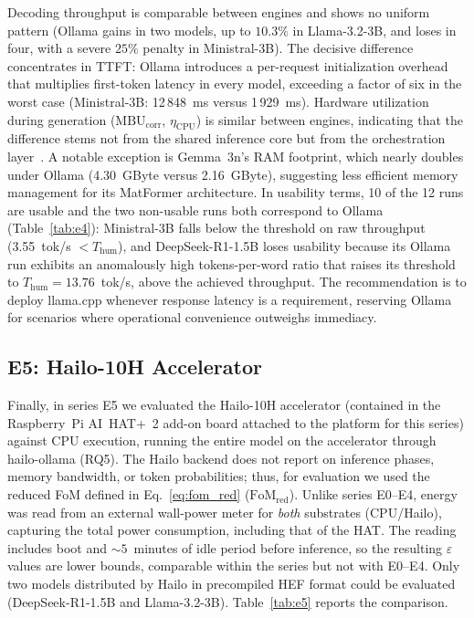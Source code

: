 \documentclass[acmsmall,natbib=false]{acmart}
\begin{document}
Decoding throughput is comparable between engines and shows no uniform
pattern (Ollama gains in two models, up to $10.3\%$ in Llama-3.2-3B, and
loses in four, with a severe $25\%$ penalty in Ministral-3B). The decisive
difference concentrates in TTFT: Ollama introduces a per-request
initialization overhead that multiplies first-token latency in every model,
exceeding a factor of six in the worst case (Ministral-3B: 12\,848~ms versus
1\,929~ms). Hardware utilization during generation
($\mathrm{MBU}_{\mathrm{corr}}$, $\eta_{\mathrm{CPU}}$) is similar between
engines, indicating that the difference stems not from the shared inference
core but from the orchestration layer~\cite{Github_Issue_Ollama}. A notable
exception is Gemma~3n's RAM footprint, which nearly doubles under Ollama
(4.30~GByte versus 2.16~GByte), suggesting less efficient memory management for its
MatFormer architecture. In usability terms, 10 of the 12 runs are usable and
the two non-usable runs both correspond to Ollama
(Table~\ref{tab:e4}): Ministral-3B falls below the threshold on raw
throughput (3.55~tok/s $< T_{\mathrm{hum}}$), and DeepSeek-R1-1.5B loses
usability because its Ollama run exhibits an anomalously high
tokens-per-word ratio that raises its threshold to
$T_{\mathrm{hum}}=13.76$~tok/s, above the achieved throughput. The
recommendation is to deploy llama.cpp
whenever response latency is a requirement, reserving Ollama for scenarios
where operational convenience outweighs immediacy.

\subsection{E5: Hailo-10H Accelerator}\label{sec:results_e5}

Finally, in series E5 we evaluated the Hailo-10H accelerator (contained in the
Raspberry~Pi AI~HAT+~2 add-on board attached to the platform for this
series) against CPU execution, running the entire model on the accelerator
through hailo-ollama (RQ5). The Hailo
backend does not report on inference phases, memory bandwidth, or token
probabilities; thus, for evaluation we used the reduced FoM defined in
Eq.~\eqref{eq:fom_red} ($\mathrm{FoM}_{\mathrm{red}}$). Unlike series E0--E4, energy was read from an
external wall-power meter for \emph{both} substrates (CPU/Hailo), capturing the total power consumption, including that of the HAT. The reading includes boot and ${\sim}5$~minutes of
idle period before inference, so the resulting $\varepsilon$ values are lower
bounds, comparable within the series but not with E0--E4. Only two models distributed by Hailo in
precompiled HEF format could be evaluated (DeepSeek-R1-1.5B and
Llama-3.2-3B). Table~\ref{tab:e5} reports the comparison.
\end{document}
